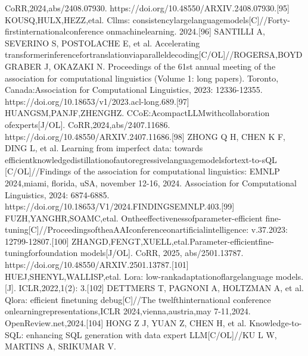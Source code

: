 \documentclass[12pt,a4paper,openright,UTF8]{ctexbook}
\begin{document}
CoRR,2024,abs/2408.07930. https://doi.org/10.48550/ARXIV.2408.07930.[95] KOUSQ,HULX,HEZZ,etal. Cllms: consistencylargelanguagemodels[C]//Forty-firstinternationalconference onmachinelearning. 2024.[96] SANTILLI A, SEVERINO S, POSTOLACHE E, et al. Accelerating transformerinferencefortranslationviaparalleldecoding[C/OL]//ROGERSA,BOYDGRABER J, OKAZAKI N. Proceedings of the 61st annual meeting of the association for computational linguistics (Volume 1: long papers). Toronto, Canada:Association for Computational Linguistics, 2023: 12336-12355. https://doi.org/10.18653/v1/2023.acl-long.689.[97] HUANGSM,PANJF,ZHENGHZ. CCoE:AcompactLLMwithcollaboration ofexperts[J/OL]. CoRR,2024,abs/2407.11686. https://doi.org/10.48550/ARXIV.2407.11686.[98] ZHONG Q H, CHEN K F, DING L, et al. Learning from imperfect data: towards efficientknowledgedistillationofautoregressivelanguagemodelsfortext-to-sQL [C/OL]//Findings of the association for computational linguistics: EMNLP 2024,miami, florida, uSA, november 12-16, 2024. Association for Computational Linguistics, 2024: 6874-6885. https://doi.org/10.18653/V1/2024.FINDINGSEMNLP.403.[99] FUZH,YANGHR,SOAMC,etal. Ontheeffectivenessofparameter-efficient fine-tuning[C]//ProceedingsoftheaAAIconferenceonartificialintelligence: v.37.2023: 12799-12807.[100] ZHANGD,FENGT,XUELL,etal.Parameter-efficientfine-tuningforfoundation models[J/OL]. CoRR, 2025, abs/2501.13787. https://doi.org/10.48550/ARXIV.2501.13787.[101] HUEJ,SHENYL,WALLISP,etal. Lora: low-rankadaptationoflargelanguage models.[J]. ICLR,2022,1(2): 3.[102] DETTMERS T, PAGNONI A, HOLTZMAN A, et al. Qlora: efficient finetuning debug[C]//The twelfthinternational conference onlearningrepresentations,ICLR 2024,vienna,austria,may 7-11,2024. OpenReview.net,2024.[104] HONG Z J, YUAN Z, CHEN H, et al. Knowledge-to-SQL: enhancing SQL generation with data expert LLM[C/OL]//KU L W, MARTINS A, SRIKUMAR V.
\end{document}
